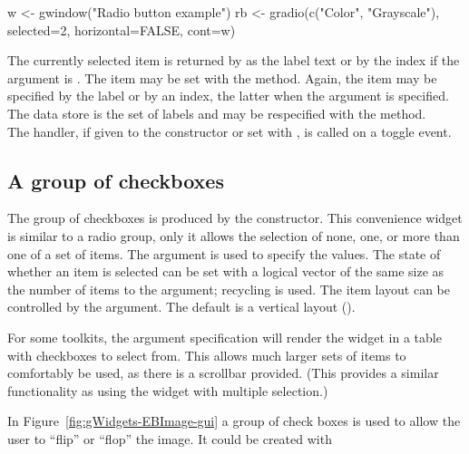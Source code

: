 \begin{Schunk}
\begin{Sinput}
 w <- gwindow("Radio button example")
 rb <- gradio(c("Color", "Grayscale"), selected=2, 
              horizontal=FALSE, cont=w)
\end{Sinput}
\end{Schunk}


The currently selected item is returned by  as
the label text or by the index if the argument  is
. The item may be set with the
 method. Again, the item may be
specified by the label or by an index, the latter when the argument
 is specified. 
\\

The data store is the set of labels and may be respecified with the
\method{[\ASSIGN}{gradio} method.
\\

The handler, if given to the constructor or set with
, is called on a toggle event.

\subsection{A group of checkboxes}
\label{sec:gWidgets-group-checkboxes}


The group of checkboxes is produced by the
 constructor. This convenience widget is
similar to a radio group, only it allows the selection of none, one,
or more than one of a set of items.  The
 argument is used to specify the
values. The state of whether an item is selected can be set with a
logical vector of the same size as the number of items to the
 argument; recycling is used. The
item layout can be controlled by the
 argument. The default is a
vertical layout ().


For some toolkits, the argument specification 
will render the widget in a table with checkboxes to select from. This
allows much larger sets of items to comfortably be used, as there is a
scrollbar provided. (This provides a similar functionality as using
the  widget with multiple selection.)


In Figure~\ref{fig:gWidgets-EBImage-gui} a group of check boxes is
used to allow the user to ``flip'' or ``flop'' the image. It could be
created with

